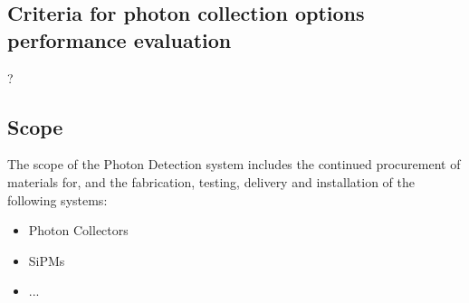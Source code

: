 
\subsection{Criteria for photon collection options performance evaluation}?


\subsection{Scope}
\label{sec:fdsp-pd-scope}

The scope of the Photon Detection system includes the continued procurement of materials for, and the fabrication, testing, delivery and installation of the following systems: 


\begin{itemize}
\item Photon Collectors 
\item SiPMs
\item ...
\end{itemize}

